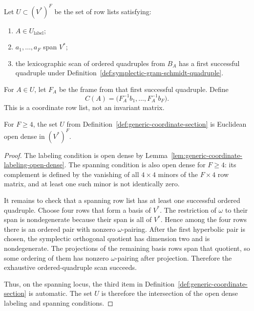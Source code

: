 \begin{definition}
\label{def:generic-coordinate-section}
Let \(U\subset (V^*)^F\) be the set of row lists satisfying:
\begin{enumerate}
  \item \(A\in U_{\mathrm{label}}\);
  \item \(a_1,\ldots,a_F\) span \(V^*\);
  \item the lexicographic scan of ordered quadruples from \(B_A\) has a first
    successful quadruple under
    Definition~\ref{def:symplectic-gram-schmidt-quadruple}.
\end{enumerate}
For \(A\in U\), let \(F_A\) be the frame from that first successful quadruple.
Define
\[
  C(A)=\bigl(F_A^{-1}b_1,\ldots,F_A^{-1}b_F\bigr).
\]
This is a coordinate row list, not an invariant matrix.
\end{definition}

\begin{lemma}
\label{lem:generic-coordinate-section-open-dense}
For \(F\ge 4\), the set \(U\) from
Definition~\ref{def:generic-coordinate-section} is Euclidean open dense in
\((V^*)^F\).
\end{lemma}

\begin{proof}
The labeling condition is open dense by
Lemma~\ref{lem:generic-coordinate-labeling-open-dense}. The spanning condition
is also open dense for \(F\ge 4\): its complement is defined by the vanishing of
all \(4\times4\) minors of the \(F\times4\) row matrix, and at least one such
minor is not identically zero.

It remains to check that a spanning row list has at least one successful
ordered quadruple. Choose four rows that form a basis of \(V^*\). The
restriction of \(\omega\) to their span is nondegenerate because their span is
all of \(V^*\). Hence among the four rows there is an ordered pair with
nonzero \(\omega\)-pairing. After the first hyperbolic pair is chosen, the
symplectic orthogonal quotient has dimension two and is nondegenerate. The
projections of the remaining basis rows span that quotient, so some ordering of
them has nonzero \(\omega\)-pairing after projection. Therefore the exhaustive
ordered-quadruple scan succeeds.

Thus, on the spanning locus, the third item in
Definition~\ref{def:generic-coordinate-section} is automatic. The set \(U\) is
therefore the intersection of the open dense labeling and spanning conditions.
\end{proof}

